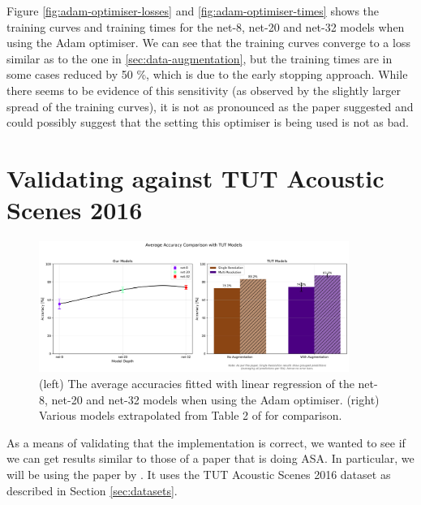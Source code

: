 \documentclass[logo,bsc,singlespacing,parskip,online]{infthesis}
\begin{document}
Figure \ref{fig:adam-optimiser-losses} and \ref{fig:adam-optimiser-times} shows 
the training curves and training times for the net-8, net-20 and net-32 models
when using the Adam optimiser. We can see that the training curves converge to a 
loss similar as to the one in \ref{sec:data-augmentation}, but the training times 
are in some cases reduced by 50 \%, which is due to the early stopping approach.
While there seems to be evidence of this sensitivity (as observed by the slightly larger spread 
of the training curves), it is not as pronounced as the paper suggested and 
could possibly suggest that the setting this optimiser is being used 
is not as bad. 

\section{Validating against TUT Acoustic Scenes 2016}
\begin{figure}[h]
   \centering
   \includegraphics[width=0.9\textwidth]{average_accuracies_tut_comparison.png}
   \caption{(left) The average accuracies fitted with linear regression of the net-8, net-20 and net-32 models when using the Adam optimiser. 
   (right) Various models extrapolated from Table 2 of \citet{schindler_multi-temporal_2018} for comparison.}
   \label{fig:tut-asa-results}
\end{figure}
As a means of validating that the implementation is correct, 
we wanted to see if we can get results similar to those of a paper 
that is doing ASA. In particular, we will be using the paper by 
\citet{schindler_multi-temporal_2018}. It uses the TUT Acoustic Scenes 2016 dataset
as described in Section \ref{sec:datasets}.
\end{document}
